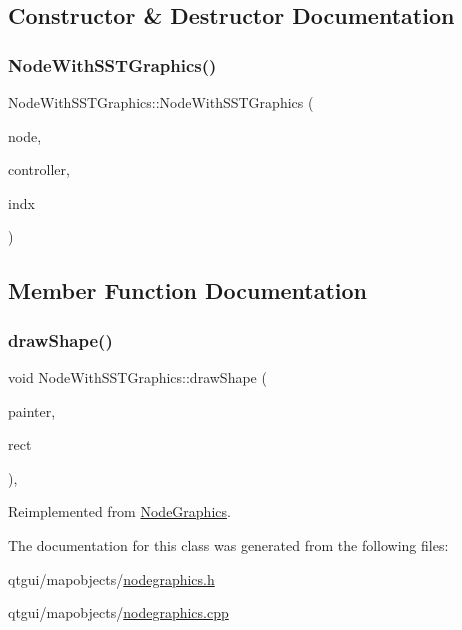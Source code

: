 \subsection{Constructor \& Destructor Documentation}
\mbox{\label{class_node_with_s_s_t_graphics_a7e4cf2513f402769551adc0507af7f8c}} 
\subsubsection{\texorpdfstring{NodeWithSSTGraphics()}{NodeWithSSTGraphics()}}
{\footnotesize\ttfamily Node\+With\+S\+S\+T\+Graphics\+::\+Node\+With\+S\+S\+T\+Graphics (\begin{DoxyParamCaption}\item[{\mbox{\hyperlink{class_node_data}{Node\+Data}} $\ast$}]{node,  }\item[{\mbox{\hyperlink{class_map_objects_controller}{Map\+Objects\+Controller}} $\ast$}]{controller,  }\item[{int}]{indx }\end{DoxyParamCaption})\hspace{0.3cm}{\ttfamily [inline]}}



\subsection{Member Function Documentation}
\mbox{\label{class_node_with_s_s_t_graphics_ae50446301160bc0aa54354c338bcc70b}} 
\subsubsection{\texorpdfstring{drawShape()}{drawShape()}}
{\footnotesize\ttfamily void Node\+With\+S\+S\+T\+Graphics\+::draw\+Shape (\begin{DoxyParamCaption}\item[{Q\+Painter \&}]{painter,  }\item[{const qmapcontrol\+::\+Rect\+World\+Px \&}]{rect }\end{DoxyParamCaption})\hspace{0.3cm}{\ttfamily [protected]}, {\ttfamily [virtual]}}



Reimplemented from \mbox{\hyperlink{class_node_graphics_a6befa2f5ffc0c7efb4e56bc0c0aeff96}{Node\+Graphics}}.



The documentation for this class was generated from the following files\+:\begin{DoxyCompactItemize}
\item 
qtgui/mapobjects/\mbox{\hyperlink{nodegraphics_8h}{nodegraphics.\+h}}\item 
qtgui/mapobjects/\mbox{\hyperlink{nodegraphics_8cpp}{nodegraphics.\+cpp}}\end{DoxyCompactItemize}
